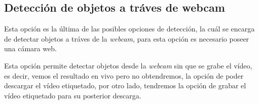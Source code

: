 \subsection{Detección de objetos a tráves de webcam}
Esta opción es la última de las posibles opciones de detección, la cuál se encarga de detectar objetos a tráves de la \textit{webcam}, para esta opción es necesario poseer una cámara web.


Esta opción permite detectar objetos desde la \textit{webcam} sin que se grabe el vídeo, es decir, vemos el resultado en vivo pero no obtendremos, la opción de poder descargar el vídeo etiquetado, por otro lado, tendremos la opción de grabar el vídeo etiquetado para su posterior descarga.